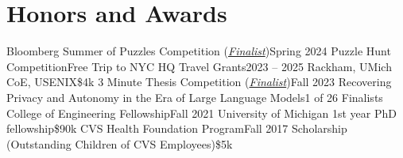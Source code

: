 \section{Honors and Awards}
  \CVSubHeadingListStart
    \CVSubheading
      {Bloomberg Summer of Puzzles Competition (\underline{\textit{Finalist}})}{Spring 2024}
      {Puzzle Hunt Competition}{Free Trip to NYC HQ}
    \CVSubheading
      {Travel Grants}{2023 -- 2025}
      {Rackham, UMich CoE, USENIX}{\$4k}
    \CVSubheading
      {3 Minute Thesis Competition (\underline{\textit{Finalist}})}{Fall 2023}
      {Recovering Privacy and Autonomy in the Era of Large Language Models}{1 of 26 Finalists}
    \CVSubheading
      {College of Engineering Fellowship}{Fall 2021}
      {University of Michigan 1st year PhD fellowship}{\$90k}
    \CVSubheading
      {CVS Health Foundation Program}{Fall 2017}
      {Scholarship (Outstanding Children of CVS Employees)}{\$5k}
  \CVSubHeadingListEnd